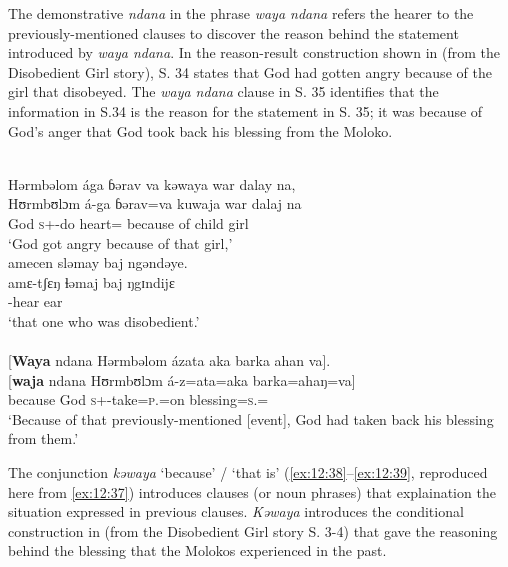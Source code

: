 The demonstrative \textit{ndana} in the phrase \textit{waya ndana} refers the hearer to the previously-mentioned clauses to discover the reason behind the statement introduced by \textit{waya ndana}. In the reason-result construction shown in  (from the Disobedient Girl story), S. 34 states that God had gotten angry because of the girl that disobeyed. The \textit{waya ndana} clause in S. 35 identifies that the information in S.34 is the reason for the statement in S. 35; it was because of God’s anger that God took back his blessing from the Moloko. 

\ea \label{ex:12:37}
\\
Hərmbəlom  ága  ɓərav  va  kəwaya  war  dalay  na,\\  
\gll  Hʊrmbʊlɔm á-ga ɓərav=va kuwaja war dalaj na\\ 
     God \textsc{s}+{\IFV}-do heart={\PRF} {because of} child girl {\PSP}\\
\glt ‘God got angry because of that girl,’\\     
     
     \medskip
amecen  sləmay  baj  ngəndəye.  \\     
\gll amɛ-tʃɛŋ ɬəmaj baj ŋgɪndijɛ \\
     {\DEP}-hear ear {\NEG} {\DEM} \\
\glt  ‘that one who was disobedient.’ \\ 

\medskip
{}\\\relax
{}[\textbf{Waya}  ndana  Hərmbəlom  ázata  aka  barka  ahan  va].\\
\gll {}[\textbf{waja} ndana Hʊrmbʊlɔm á-z=ata=aka barka=ahaŋ=va]\\ 
     because   {\DEM} God \textsc{s}+{\IFV}-take=\textsc{p}.{\IO}=on blessing=\textsc{s}.{\POSS}={\PRF} \\    
\glt ‘Because of that previously-mentioned [event], God had taken back his blessing from them.’
\z 

The conjunction \textit{kəwaya}  ‘because’ / ‘that is’ (\ref{ex:12:38}--\ref{ex:12:39}, reproduced here from \ref{ex:12:37}) introduces clauses (or noun phrases) that explaination the situation expressed in previous clauses. \textit{Kəwaya} introduces the conditional construction in  (from the Disobedient Girl story S. 3-4) that gave the reasoning behind the blessing that the Molokos experienced in the past. 

